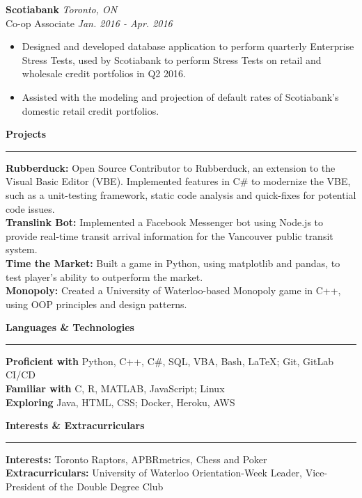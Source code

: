 \documentclass{letter}
\begin{document}
\begin{flushleft}
		{\large\textbf{Scotiabank}}  \hfill \textit{Toronto, ON} \\
		\vspace{1pt}
		Co-op Associate \hfill \textit{Jan. 2016 - Apr. 2016}
		\vspace{-9pt}
		\begin{itemize}
			\item Designed and developed database application to perform quarterly Enterprise Stress Tests, used by Scotiabank to perform Stress Tests on retail and wholesale credit portfolios in Q2 2016.\vspace{-3pt}
			\item Assisted with the modeling and projection of default rates of Scotiabank's domestic retail credit portfolios. 
		\end{itemize}
	\end{flushleft}

	\begin{flushleft}
		{\Large \textbf{Projects}}
		\rule[5pt]{\textwidth}{0.4pt}
		\textbf{Rubberduck:} Open Source Contributor to Rubberduck, an extension to the Visual Basic Editor (VBE). Implemented features in C\# to modernize the VBE, such as a unit-testing framework, static code analysis and quick-fixes for potential code issues.\\
		\textbf{Translink Bot:} Implemented a Facebook Messenger bot using Node.js to provide real-time transit arrival information for the Vancouver public transit system.\\
		\textbf{Time the Market:} Built a game in Python, using matplotlib and pandas, to test player's ability to outperform the market.\\
		\textbf{Monopoly:} Created a University of Waterloo-based Monopoly game in C++, using OOP principles and design patterns.
	\end{flushleft}
	
	\begin{flushleft}
		{\Large \textbf{Languages \& Technologies}}
		\rule[5pt]{\textwidth}{0.4pt}
		\textbf{Proficient with} Python, C++, C\#, SQL, VBA, Bash, \LaTeX; Git, GitLab CI/CD\\
		\textbf{Familiar with} C, R, MATLAB, JavaScript; Linux \\
		\textbf{Exploring} Java, HTML, CSS; Docker, Heroku, AWS
	\end{flushleft}

	\begin{flushleft}
		{\Large \textbf{Interests \& Extracurriculars}}
		\rule[5pt]{\textwidth}{0.4pt}
		\textbf{Interests:} Toronto Raptors, APBRmetrics, Chess and Poker\\
		\textbf{Extracurriculars:} University of Waterloo Orientation-Week Leader, Vice-President of the Double Degree Club
	\end{flushleft}
\end{document}
